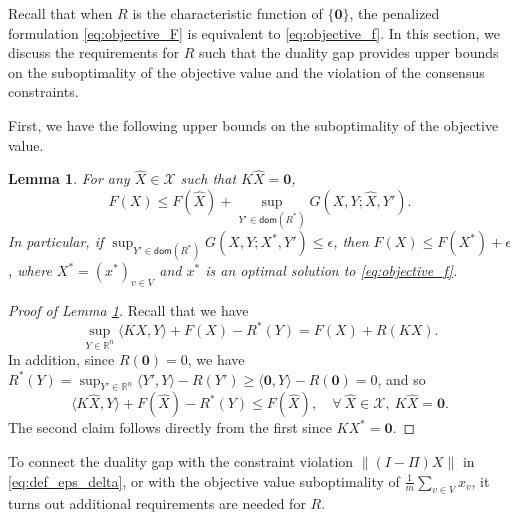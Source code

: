 \documentclass[10pt]{article}
\newcommand{\mc}{\mathcal}
\newcommand{\mb}{\mathbf}
\newcommand{\R}{\mathbb{R}}
\newcommand{\domain}{\mathsf{dom}}
\newtheorem{lemma}{Lemma}[section]
\begin{document}
Recall that when $R$ is the characteristic function of $\{\mb 0\}$, the penalized formulation \eqref{eq:objective_F} is equivalent to \eqref{eq:objective_f}. In this section, we discuss the requirements for $R$ such that the duality gap provides upper bounds on the suboptimality of the objective value and the violation of the consensus constraints.  

First, we have the following upper bounds on the suboptimality of the objective value.  
\begin{lemma}\label{lm:eps-subopt}
For any $\widehat{X}\in {\mc X}$ such that $K\widehat{X} = \mb 0$,
\begin{displaymath}
F(X)\leq F(\widehat{X}) + \sup_{Y'\in \domain(R^*)} G(X,Y;\widehat{X},Y').
\end{displaymath}
In particular, if $\sup_{Y'\in \domain(R^*)} G(X,Y;X^*,Y')\leq \epsilon$, then $F(X)\leq F(X^*) + \epsilon$, where $X^* = (x^*)_{v\in V}$ and $x^*$ is an optimal solution to \eqref{eq:objective_f}. 
\end{lemma}
\begin{proof}[Proof of Lemma \ref{lm:eps-subopt}]
   Recall that we have
\begin{displaymath}
    \sup_{Y\in \R^n} \langle KX,Y\rangle + F(X) - R^*(Y) = F(X) + R(KX).
\end{displaymath}
In addition, since $R(\mb 0) =  0$, we have $R^*(Y) = \sup_{Y'\in \R^n} \langle Y',Y\rangle - R(Y')\geq \langle \mb 0,Y\rangle - R(\mb 0) =0$, and so
\begin{displaymath}
    \langle K\widehat{X},Y\rangle + F(\widehat{X}) - R^*(Y) \leq F(\widehat{X}),\quad \forall~\widehat{X}\in {\mc X},~K\widehat{X} = \mb 0.
\end{displaymath}
The second claim follows directly from the first since $KX^* = \mb 0$. 
\end{proof}




To connect the duality gap with the constraint violation $\|(I-\Pi)X\|$ in \eqref{eq:def_eps_delta}, or with the objective value suboptimality of $\frac{1}{m}\sum_{v\in V} x_v$, it turns out additional requirements are needed for $R$. 

\end{document}
